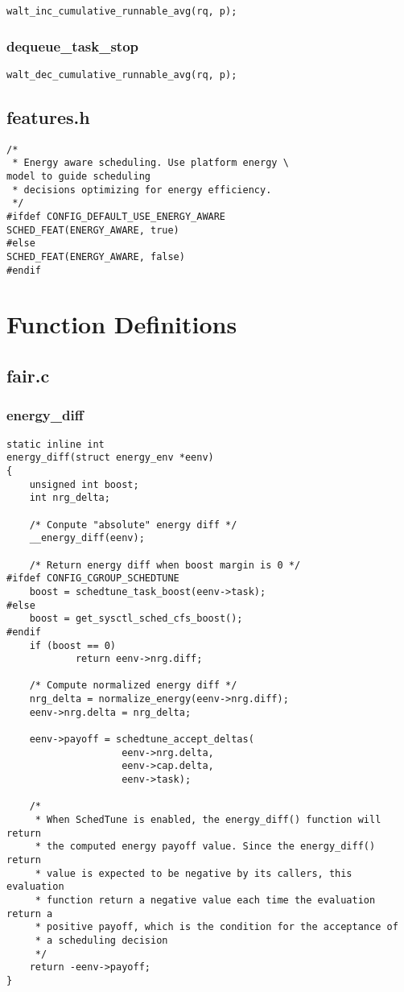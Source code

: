 \documentclass{article}
\begin{document}
\begin{verbatim}
walt_inc_cumulative_runnable_avg(rq, p);
\end{verbatim}

\subsubsection{dequeue\_task\_stop}

\begin{verbatim}
walt_dec_cumulative_runnable_avg(rq, p);
\end{verbatim}

\subsection{features.h}

\begin{verbatim}
/*
 * Energy aware scheduling. Use platform energy \
model to guide scheduling
 * decisions optimizing for energy efficiency.
 */
#ifdef CONFIG_DEFAULT_USE_ENERGY_AWARE
SCHED_FEAT(ENERGY_AWARE, true)
#else
SCHED_FEAT(ENERGY_AWARE, false)
#endif
\end{verbatim}

\section{Function Definitions}

\subsection{fair.c}

\subsubsection{energy\_diff}
\begin{verbatim}
static inline int
energy_diff(struct energy_env *eenv)
{
    unsigned int boost;
    int nrg_delta;

    /* Conpute "absolute" energy diff */
    __energy_diff(eenv);

    /* Return energy diff when boost margin is 0 */
#ifdef CONFIG_CGROUP_SCHEDTUNE
    boost = schedtune_task_boost(eenv->task);
#else
    boost = get_sysctl_sched_cfs_boost();
#endif
    if (boost == 0)
            return eenv->nrg.diff;

    /* Compute normalized energy diff */
    nrg_delta = normalize_energy(eenv->nrg.diff);
    eenv->nrg.delta = nrg_delta;

    eenv->payoff = schedtune_accept_deltas(
                    eenv->nrg.delta,
                    eenv->cap.delta,
                    eenv->task);

    /*
     * When SchedTune is enabled, the energy_diff() function will return
     * the computed energy payoff value. Since the energy_diff() return
     * value is expected to be negative by its callers, this evaluation
     * function return a negative value each time the evaluation return a
     * positive payoff, which is the condition for the acceptance of
     * a scheduling decision
     */
    return -eenv->payoff;
}
\end{verbatim}
\end{document}
